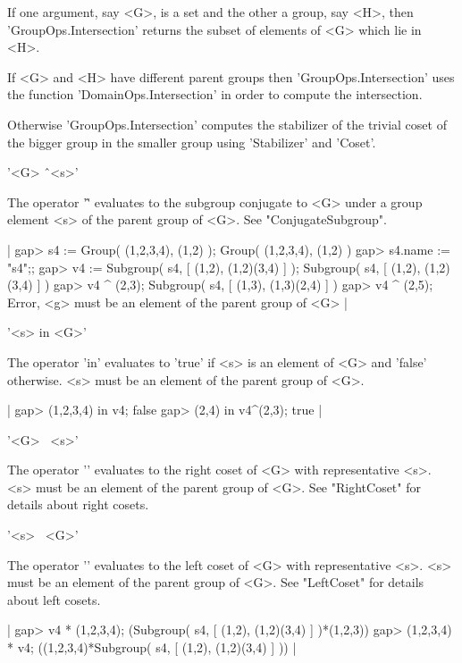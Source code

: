 If one argument, say <G>, is a set and the  other a  group, say <H>, then
'GroupOps.Intersection' returns the subset  of elements of <G> which  lie
in <H>.

If <G> and <H> have  different parent groups then 'GroupOps.Intersection'
uses the function  'DomainOps.Intersection'  in   order to  compute   the
intersection.

Otherwise 'GroupOps.Intersection' computes the  stabilizer of the trivial
coset  of  the bigger group in  the  smaller group using 'Stabilizer' and
'Coset'.

%

'<G> \^\ <s>'%

The operator '\^' evaluates  to  the subgroup   conjugate to <G>  under a
group element <s> of the parent group of <G>.  See "ConjugateSubgroup".

|    gap> s4 := Group( (1,2,3,4), (1,2) );
    Group( (1,2,3,4), (1,2) )
    gap> s4.name := "s4";;
    gap> v4 := Subgroup( s4, [ (1,2), (1,2)(3,4) ] );
    Subgroup( s4, [ (1,2), (1,2)(3,4) ] )
    gap> v4 ^ (2,3);
    Subgroup( s4, [ (1,3), (1,3)(2,4) ] )
    gap> v4 ^ (2,5);
    Error, <g> must be an element of the parent group of <G> |

\vspace{5mm}
'<s> in <G>'%

The operator 'in'  evaluates to  'true' if <s> is an  element of  <G> and
'false' otherwise. <s> must be an element of the parent group of <G>.

|    gap> (1,2,3,4) in v4;
    false
    gap> (2,4) in v4^(2,3);
    true |

\vspace{5mm}
'<G> \*\ <s>'%

The operator '\*' evaluates to the right coset of <G> with representative
<s>.   <s>  must  be  an  element  of  the  parent  group  of  <G>.   See
"RightCoset" for details about right cosets.

\vspace{5mm}
'<s> \*\ <G>'

The operator '\*' evaluates to the left coset of <G>  with representative
<s>.  <s> must be an element of the parent group of <G>.  See "LeftCoset"
for details about left cosets.

|    gap> v4 * (1,2,3,4);
    (Subgroup( s4, [ (1,2), (1,2)(3,4) ] )*(1,2,3))
    gap> (1,2,3,4) * v4;
    ((1,2,3,4)*Subgroup( s4, [ (1,2), (1,2)(3,4) ] )) |

